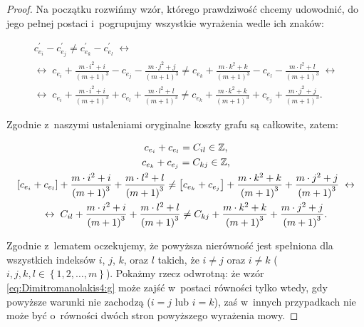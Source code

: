 \begin{proof}
	Na początku rozwińmy wzór, którego prawdziwość chcemy udowodnić, do jego pełnej postaci i~pogrupujmy wszystkie wyrażenia wedle ich znaków:
	
	\begin{gather}
		c^{\prime}_{e_{i}} - c^{\prime}_{e_{j}} \neq c^{\prime}_{e_{k}} - c^{\prime}_{e_{l}} \; \leftrightarrow \\
		\leftrightarrow \; c_{e_{i}} + \frac{m \cdot i^{2} + i}{\left( m + 1 \right)^{3}} - c_{e_{j}} - \frac{m \cdot j^{2} + j}{\left( m + 1 \right)^{3}} \neq c_{e_{k}} + \frac{m \cdot k^{2} + k}{\left( m + 1 \right)^{3}} - c_{e_{l}} - \frac{m \cdot l^{2} + l}{\left( m + 1 \right)^{3}} \; \leftrightarrow \\
		\leftrightarrow \; c_{e_{i}} + \frac{m \cdot i^{2} + i}{\left( m + 1 \right)^{3}} + c_{e_{l}} + \frac{m \cdot l^{2} + l}{\left( m + 1 \right)^{3}} \neq c_{e_{k}} + \frac{m \cdot k^{2} + k}{\left( m + 1 \right)^{3}} + c_{e_{j}} + \frac{m \cdot j^{2} + j}{\left( m + 1 \right)^{3}}\text{.}
	\end{gather}
	
	Zgodnie z~naszymi ustaleniami oryginalne koszty grafu są całkowite, zatem:
	
	\begin{gather}
		c_{e_{i}} + c_{e_{l}} = C_{il} \in \mathbb{Z}\text{,} \\
		c_{e_{k}} + c_{e_{j}} = C_{kj} \in \mathbb{Z}\text{,} \\
		\left[ c_{e_{i}} + c_{e_{l}} \right] + \frac{m \cdot i^{2} + i}{\left( m + 1 \right)^{3}} + \frac{m \cdot l^{2} + l}{\left( m + 1 \right)^{3}} \neq \left[ c_{e_{k}} + c_{e_{j}} \right] + \frac{m \cdot k^{2} + k}{\left( m + 1 \right)^{3}} + \frac{m \cdot j^{2} + j}{\left( m + 1 \right)^{3}} \; \leftrightarrow \\
		\leftrightarrow \; C_{il} + \frac{m \cdot i^{2} + i}{\left( m + 1 \right)^{3}} + \frac{m \cdot l^{2} + l}{\left( m + 1 \right)^{3}} \neq C_{kj} + \frac{m \cdot k^{2} + k}{\left( m + 1 \right)^{3}} + \frac{m \cdot j^{2} + j}{\left( m + 1 \right)^{3}}\label{eq:Dimitromanolakis4:g}\text{.}
	\end{gather}
	
	Zgodnie z~lematem oczekujemy, że powyższa nierówność jest spełniona dla wszystkich indeksów $i$, $j$, $k$, oraz $l$ takich, że $i \neq j$ oraz $i \neq k$ ($i, j, k, l \in \left\{ 1, 2, \dots, m \right\}$).
	Pokażmy rzecz odwrotną: że wzór \ref{eq:Dimitromanolakis4:g} może zajść w~postaci równości tylko wtedy, gdy powyższe warunki nie zachodzą ($i = j$ lub $i = k$), zaś w~innych przypadkach nie może być o~równości dwóch stron powyższego wyrażenia mowy.
	

\end{proof}
